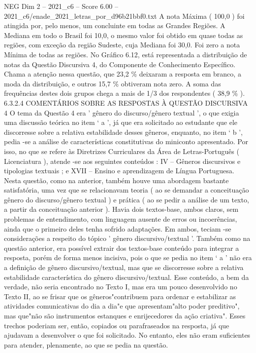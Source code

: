 \begin{textsample}{NEG Dim 2 – 2021\_c6 – Score 6.00 – 2021\_c6/enade\_2021\_letras\_por\_d96b21bbf0.txt}
A nota Máxima ( 100,0 ) foi atingida por, pelo menos, um concluinte em todas as Grandes Regiões.
A Mediana em todo o Brasil foi 10,0, o mesmo valor foi obtido em quase todas as regiões, com exceção da região Sudeste, cuja Mediana foi 30,0.
Foi zero a nota Mínima de todas as regiões.
No Gráfico 6.12, está representada a distribuição de notas da Questão Discursiva 4, do Componente de Conhecimento Específico.
Chama a atenção nessa questão, que 23,2 \% deixaram a resposta em branco, a moda da distribuição, e outros 15,7 \% obtiveram nota zero.
A soma das frequências destes dois grupos chega a mais de 1/3 dos respondentes ( 38,9 \% ). 6.3.2.4 COMENTÁRIOS SOBRE AS RESPOSTAS À QUESTÃO DISCURSIVA 4 O tema da Questão 4 era ' gênero do discurso/gênero textual ', o que exigia uma discussão teórica no item ‘ a ’, já que era solicitado ao estudante que ele discorresse sobre a relativa estabilidade desses gêneros, enquanto, no item ‘ b ’, pedia -se a análise de características constitutivas do miniconto apresentado.
Por isso, no que se refere às Diretrizes Curriculares da Área de Letras-Português ( Licenciatura ), atende -se aos seguintes conteúdos : IV – Gêneros discursivos e tipologias textuais ; e XVII – Ensino e aprendizagem de Língua Portuguesa.
Nesta questão, como na anterior, também houve uma abordagem bastante satisfatória, uma vez que se relacionavam teoria ( ao se demandar a conceituação gênero do discurso/gênero textual ) e prática ( ao se pedir a análise de um texto, a partir da conceituação anterior ).
Havia dois textos-base, ambos claros, sem problemas de entendimento, com linguagem ausente de erros ou incoerências, ainda que o primeiro deles tenha sofrido adaptações.
Em ambos, teciam -se considerações a respeito do tópico ' gênero discursivo/textual '.
Também como na questão anterior, era possível extrair dos textos-base conteúdo para integrar a resposta, porém de forma menos incisiva, pois o que se pedia no item ‘ a ’ não era a definição de gênero discursivo/textual, mas que se discorresse sobre a relativa estabilidade característica do gênero discursivo/textual.
Esse conteúdo, a bem da verdade, não seria encontrado no Texto I, mas era um pouco desenvolvido no Texto II, ao se frisar que os gêneros"contribuem para ordenar e estabilizar as atividades comunicativas do dia a dia"e que apresentam"alto poder preditivo", mas que"não são instrumentos estanques e enrijecedores da ação criativa".
Esses trechos poderiam ser, então, copiados ou parafraseados na resposta, já que ajudavam a desenvolver o que foi solicitado.
No entanto, eles não eram suficientes para atender, plenamente, ao que se pedia na questão.

\end{textsample}
